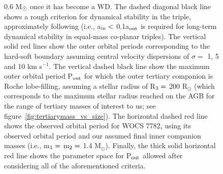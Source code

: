 \documentclass[twocolumn]{aastex62}
\begin{document}
\begin{figure}[ht!]
{0.6 M$_{\rm \odot}$ once it has become a WD.  The dashed diagonal
black line shows a rough criterion for dynamical stability in the
triple, approximately following \citet{1999ASIC..522..385M} (i.e.,
a$_{\rm in} <$ 0.1a$_{\rm out}$ is required for long-term dynamical
stability in equal-mass co-planar triples).  The vertical solid red
lines show the outer orbital periods corresponding to the hard-soft
boundary assuming central velocity dispersions of $\sigma =$ 1, 5 and
10 km s$^{-1}$.  The vertical dashed black line show the maximum
outer orbital period P$_{\rm out}$ for which the outer tertiary
companion is Roche lobe-filling, assuming a stellar radius of R$_{\rm
  3} =$ 200 R$_{\odot}$ (which corresponds to the maximum stellar
radius reached on the AGB for the range of tertiary masses of interest
to us; see figure~\ref{fig:tertiarymass_vs_size}).  The horizontal
dashed red line shows the observed orbital period for WOCS 7782,
using its observed orbital period and our assumed final inner
companion masses (i.e., m$_{\rm 1} =$ m$_{\rm 2} =$ 1.4 M$_{\odot}$).
Finally, the thick solid horizontal red line shows the parameter space
for P$_{\rm out}$ allowed after considering all of the aforementioned
criteria.
\label{fig:fig2}}
\end{figure}
\end{document}

